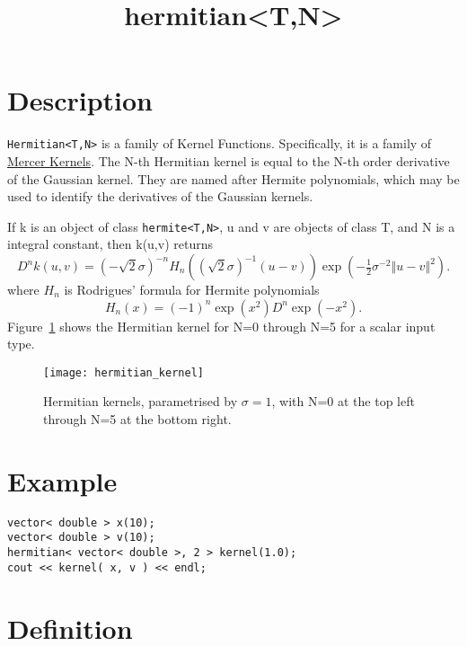 \documentclass{article}
\newcommand{\half}{\tfrac{1}{2}}
\begin{document}
\title{hermitian<T,N>}
\maketitle

\section*{Description}

\texttt{Hermitian<T,N>} is a family of Kernel Functions. Specifically, it is a family of 
\href{\kmlroot/mercer_kernel.html}{Mercer Kernels}. 
The N-th Hermitian kernel is equal to the N-th order derivative of the Gaussian kernel. 
They are named after Hermite polynomials, which may be used to identify the derivatives of the Gaussian kernels. 

If k is an object of class \texttt{hermite<T,N>}, u and v are objects of class T, and N is a integral constant, then k(u,v) returns
%
\begin{equation}
D^{n}k(u,v)=(-\sqrt{2}\sigma)^{-n}H_{n}((\sqrt{2}\sigma)^{-1}(u-v))\exp(-\half\sigma^{-2}\left\Vert u-v\right\Vert^{2}).
\end{equation}
%
where $H_n$ is Rodrigues' formula for Hermite polynomials
\begin{equation}
H_{n}(x)=(-1)^{n}\exp(x^{2})D^{n}\exp(-x^{2}).
\end{equation}
%
Figure~\ref{figure:hermitian_kernel} shows the Hermitian kernel for N=0 through N=5 for a scalar input type.

\begin{figure}
\texttt{[image: hermitian\_kernel]}
\caption{Hermitian kernels, parametrised by $\sigma=1$, with N=0 at the top left through N=5 at the bottom right.}
\label{figure:hermitian_kernel}
\end{figure}


\section*{Example}


\highlightcpp{}
\begin{verbatim}
vector< double > x(10);
vector< double > v(10);
hermitian< vector< double >, 2 > kernel(1.0);
cout << kernel( x, v ) << endl;
\end{verbatim}


\section*{Definition}
\end{document}
